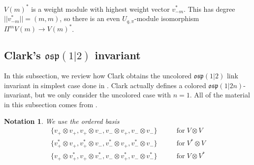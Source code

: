 \documentclass{amsart}
\theoremstyle{plain}
\newtheorem{notation}[theorem]{Notation}
\theoremstyle{definition}
\newtheorem{definition}[theorem]{Definition}
\theoremstyle{definition}
\numberwithin{equation}{section}
\numberwithin{theorem}{section}
\renewcommand{\to}{\rightarrow}
\def\mf{\mathfrak}
\numberwithin{equation}{section}
\def\ME#1{\textcolor[rgb]{0.40,0.00,0.90}{[ME: #1]}}%
\begin{document}
$V(m)^*$ is a weight module with highest weight vector $v_{-m}^*$. This has degree $||v_{-m}^*||=(m,m)$, so there is an even $U_{q,\pi}$-module isomorphism $\Pi^m V(m) \to V(m)^*$.

\subsection{Clark's $\mf{osp}(1|2)$ invariant}\label{Sec:Clark-method}
In this subsection, we review how Clark obtains the uncolored $\mf{osp}(1|2)$ link invariant in simplest case done in \cite[Example 3.10]{C}.
Clark actually defines a colored $\mf{osp}(1|2n)$-invariant, but we only consider the uncolored case with $n=1$.
All of the material in this subsection comes from \cite[Section 2, Section 3]{C}.

\begin{notation}
  We use the ordered basis
  \begin{align*}
    \{v_{+}\otimes v_{+}, v_{+}\otimes v_{-}, v_{-}\otimes v_{+}, v_{-}\otimes v_{-}\} &\qquad \text{for} \; V\otimes V \\
    \{v_{+}^*\otimes v_{+}, v_{+}^*\otimes v_{-}, v_{-}^*\otimes v_{+}, v_{-}^*\otimes v_{-}\} &\qquad \text{for} \; V^*\otimes V  \\
    \{v_{+}\otimes v_{+}^*, v_{+}\otimes v_{-}^*, v_{-}\otimes v_{+}^*, v_{-}\otimes v_{-}^*\} &\qquad \text{for} \; V\otimes V^*
  \end{align*}
\end{notation}
\end{document}
